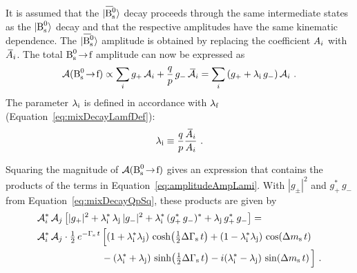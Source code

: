 It is assumed that the $\Bsbarst$ decay proceeds through the same intermediate states as the $\Bsst$ decay and that the respective
amplitudes have the same kinematic dependence. The $\Bsbarst$ amplitude is obtained by replacing the coefficient $\Ai$ with $\Abari$. The
total $\Bstof$ amplitude can now be expressed as
\begin{equation}
  \label{eq:amplitudeAmpLami}
  \mathcal{A}(\Bstof) \propto \sum_i g_+\, \Af[i] + \qp\, g_-\, \Abarf[i] = \sum_i \left( g_+ + \lamf[i]\, g_- \right) \Af[i]
  \ .
\end{equation}
The parameter $\lamf[i]$ is defined in accordance with $\lamf$ (Equation~\ref{eq:mixDecayLamfDef}):
\begin{equation}
  \label{eq:amplitudeLamiDef}
  \lamf[i]\equiv\qp\frac{\Abari}{\Ai}
  \ .
\end{equation}

Squaring the magnitude of $\mathcal{A}(\Bstof)$ gives an expression that contains the products of the terms in
Equation~\ref{eq:amplitudeAmpLami}.  With $|g_\pm|^2$ and $g_+^*\,g_-$ from Equation~\ref{eq:mixDecayQpSq}, these products are given by
\begin{align}
  &\Af[i]^*\,\Af[j] \left[ |g_+|^2 + \lamf[i]^*\,\lamf[j]\, |g_-|^2 + \lamf[i]^*\, (g_+^*\,g_-)^* + \lamf[j]\, g_+^*\,g_- \right]
      = \nonumber \\
  &\Af[i]^*\,\Af[j] \cdot \tfrac{1}{2}\, \eGst\, \Big[    (1+\lamf[i]^*\lamf[j]) \, \cDGs
                                                      +   (1-\lamf[i]^*\lamf[j]) \, \cDms \\
  &\qquad\qquad\qquad\ \                              -   (\lamf[i]^* + \lamf[j])\,   \sDGs
                                                      - i (\lamf[i]^* - \lamf[j])\,   \sDms \Big] \ . \nonumber
\end{align}

